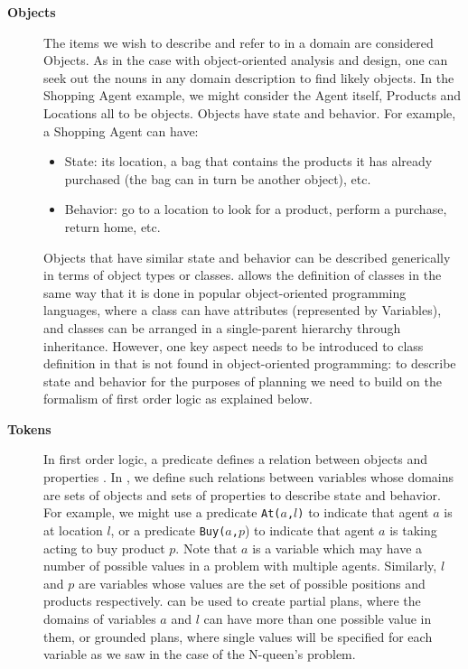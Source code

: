 \begin{description}
\item[\textbf{Objects}] The items we wish to describe and refer to in
  a domain are considered Objects. As in the case with object-oriented
  analysis and design, one can seek out the nouns in any domain
  description to find likely objects. In the Shopping Agent example,
  we might consider the Agent itself, Products and Locations all to be
  objects. Objects have state and behavior. For example, a Shopping
  Agent can have:

  \begin{itemize}

  \item State: its location, a bag that contains the products it has
    already purchased (the bag can in turn be another object), etc.

  \item Behavior: go to a location to look for a product, perform a
    purchase, return home, etc.

  \end{itemize}

  Objects that have similar state and behavior can be described
  generically in terms of object types or classes. \eu allows the
  definition of classes in the same way that it is done in popular
  object-oriented programming languages, where a class can have
  attributes (represented by Variables), and classes can be arranged
  in a single-parent hierarchy through inheritance.  However, one key
  aspect needs to be introduced to class definition in \eu that is not
  found in object-oriented programming: to describe state and behavior
  for the purposes of planning we need to build on the formalism of
  first order logic as explained below.

\item[\textbf{Tokens}] In first order logic, a predicate defines a
  relation between objects and properties .  In
  \eu, we define such relations between variables whose domains are
  sets of objects and sets of properties to describe state and
  behavior. For example, we might use a predicate \texttt{At($a$,$l$)}
  to indicate that agent $a$ is at location $l$, or a predicate
  \texttt{Buy($a$,$p$}) to indicate that agent $a$ is taking acting to
  buy product $p$. Note that $a$ is a variable which may have a number
  of possible values in a problem with multiple agents. Similarly, $l$
  and $p$ are variables whose values are the set of possible positions
  and products respectively. \eu can be used to create partial plans,
  where the domains of variables $a$ and $l$ can have more than one
  possible value in them, or grounded plans, where single values will
  be specified for each variable as we saw in the case of the
  N-queen's problem.


\end{description}
